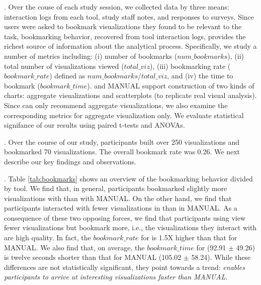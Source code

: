 .
Over the couse of each study session, we collected data by three means: interaction logs 
from each tool, study staff notes, and responses to surveys.
Since users were asked to bookmark visualizations they found to be relevant to the task,
bookmarking behavior, recovered from tool interaction logs, provides the richest source
of information about the analytical process.
Specifically, we study a number of metrics including: (i) number of bookmarks ($num\_bookmarks$), 
(ii) total number of visualizations viewed ($total\_viz$), 
(iii) bookmarking rate ($bookmark\_rate$) defined as $num\_bookmarks$/$total\_viz$, and 
(iv) the time to bookmark ($bookmark\_time$).
\SeeDB and MANUAL support construction of two kinds of charts: aggregate visualizations and 
scatterplots (to replicate real visual analysis).
Since \SeeDB can only recommend aggregate visualizations, we also examine the corresponding
metrics for aggregate visualization only.
We evaluate statistical signifance of our results using paired t-tests and ANOVAs.


.
Over the course of our study, participants built over 250 visualizations and bookmarked 70
visualizations.
The overall bookmark rate was 0.26.
We next describe our key findings and observations.

.
Table \ref{tab:bookmarks} shows an overview of the bookmarking behavior divided by tool.
We find that, in general, participants bookmarked slightly more visualizations with \SeeDB than 
with MANUAL.
On the other hand, we find that participants interacted with fewer visualizations in \SeeDB than
in MANUAL.
As a consequence of these two opposing forces, we find that participants using \SeeDB view fewer
visualizations but bookmark more, i.e., the visualizations they interact with are high quality.
In fact, the $bookmark\_rate$ for \SeeDB is 1.5X higher than that for MANUAL.
We also find that, on average, the $bookmark\_time$ for \SeeDB (92.91 $\pm$ 49.26) is twelve seconds 
shorter than that for MANUAL (105.02 $\pm$ 58.24). 
While these differences are not statistically significant, they point towards a trend: {\it \SeeDB
enables participants to arrive at interesting visualizations faster than MANUAL}.

